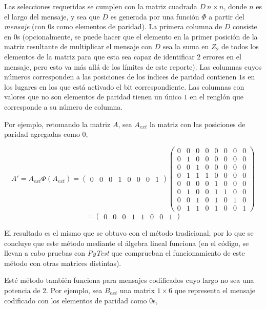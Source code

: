 \documentclass{article}
\begin{document}
Las selecciones requeridas se cumplen con la matriz cuadrada $D\ n \times n$, donde $n$ es el largo del mensaje, y sea que $D$ es generada por una función $\Phi$ a partir del \textit{mensaje} (con $0$s como elementos de paridad). La primera columna de $D$ consiste en $0$s (opcionalmente, se puede hacer que el elemento en la primer posición de la matriz resultante de multiplicar el mensaje con $D$ sea la suma en $Z_2$ de todos los elementos de la matriz para que esta sea capaz de identificar 2 errores en el mensaje, pero esto va más allá de los límites de este reporte). Las columnas cuyos números corresponden a las posiciones de los índices de paridad contienen $1$s en los lugares en los que está activado el bit correspondiente. Las columnas con valores que no son elementos de paridad tienen un único $1$ en el renglón que corresponde a su número de columna.

Por ejemplo, retomando la matriz $A$, sea $A_{ext}$ la matriz con las posiciones de paridad agregadas como $0$,

$$
A' = A_{ext} \Phi(A_{ext}) = \begin{pmatrix}
    0 & 0 & 0 & 1 & 0 & 0 & 0 & 1
\end{pmatrix}
\begin{pmatrix}
    0 & 0 & 0 & 0 & 0 & 0 & 0 & 0 \\
    0 & 1 & 0 & 0 & 0 & 0 & 0 & 0 \\
    0 & 0 & 1 & 0 & 0 & 0 & 0 & 0 \\
    0 & 1 & 1 & 1 & 0 & 0 & 0 & 0 \\
    0 & 0 & 0 & 0 & 1 & 0 & 0 & 0 \\
    0 & 1 & 0 & 0 & 1 & 1 & 0 & 0 \\
    0 & 0 & 1 & 0 & 1 & 0 & 1 & 0 \\
    0 & 1 & 1 & 0 & 1 & 0 & 0 & 1
\end{pmatrix}
$$$$
= \begin{pmatrix}
    0 & 0 & 0 & 1 & 1 & 0 & 0 & 1
\end{pmatrix}
$$

El resultado es el mismo que se obtuvo con el método tradicional, por lo que se concluye que este método mediante el álgebra lineal funciona (en el código, se llevan a cabo pruebas con \textit{PyTest} que comprueban el funcionamiento de este método con otras matrices distintas).

Esté método también funciona para mensajes codificados cuyo largo no sea una potencia de $2$. Por ejemplo, sea $B_{ext}$ una matrix $1 \times 6$ que representa el mensaje codificado con los elementos de paridad como $0$s,
\end{document}

